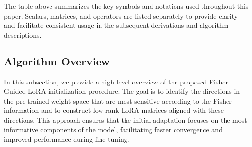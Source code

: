 \documentclass{article}
\theoremstyle{plain}
\theoremstyle{definition}
\theoremstyle{remark}
\begin{document}
The table above summarizes the key symbols and notations used throughout this paper. Scalars, matrices, and operators are listed separately to provide clarity and facilitate consistent usage in the subsequent derivations and algorithm descriptions.

\subsection{Algorithm Overview}

In this subsection, we provide a high-level overview of the proposed Fisher-Guided LoRA initialization procedure. The goal is to identify the directions in the pre-trained weight space that are most sensitive according to the Fisher information and to construct low-rank LoRA matrices aligned with these directions. This approach ensures that the initial adaptation focuses on the most informative components of the model, facilitating faster convergence and improved performance during fine-tuning.
\end{document}
